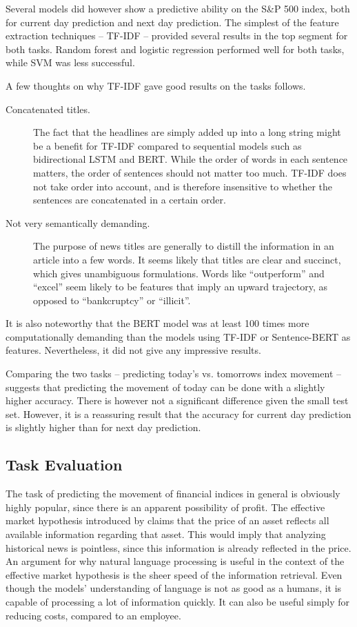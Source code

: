 Several models did however show a predictive ability on the S\&P 500 index, both for current day prediction and next day prediction. The simplest of the feature extraction techniques -- TF-IDF -- provided several results in the top segment for both tasks. Random forest and logistic regression performed well for both tasks, while SVM was less successful.

A few thoughts on why TF-IDF gave good results on the tasks follows. 
\begin{description}
    \item[Concatenated titles.] The fact that the headlines are simply added up into a long string might be a benefit for TF-IDF compared to sequential models such as bidirectional LSTM and BERT. While the order of words in each sentence matters, the order of sentences should not matter too much. TF-IDF does not take order into account, and is therefore insensitive to whether the sentences are concatenated in a certain order. 
    \item[Not very semantically demanding. ] The purpose of news titles are generally to distill the information in an article into a few words. It seems likely that titles are clear and succinct, which gives unambiguous formulations. Words like ``outperform'' and ``excel'' seem likely to be features that imply an upward trajectory, as opposed to ``bankcruptcy'' or ``illicit''. 
\end{description}

It is also noteworthy that the BERT model was at least 100 times more computationally demanding than the models using TF-IDF or Sentence-BERT as features. Nevertheless, it did not give any impressive results. 

Comparing the two tasks -- predicting today's vs. tomorrows index movement -- suggests that predicting the movement of today can be done with a slightly higher accuracy. There is however not a significant difference given the small test set. However, it is a reassuring result that the accuracy for current day prediction is slightly higher than for next day prediction. 

\subsection{Task Evaluation}

The task of predicting the movement of financial indices in general is obviously highly popular, since there is an apparent possibility of profit. The effective market hypothesis introduced by \citeauthor{malkiel1970efficient} claims that the price of an asset reflects all available information regarding that asset. This would imply that analyzing historical news is pointless, since this information is already reflected in the price. An argument for why natural language processing is useful in the context of the effective market hypothesis is the sheer speed of the information retrieval. Even though the models' understanding of language is not as good as a humans, it is capable of processing a lot of information quickly. It can also be useful simply for reducing costs, compared to an employee.

